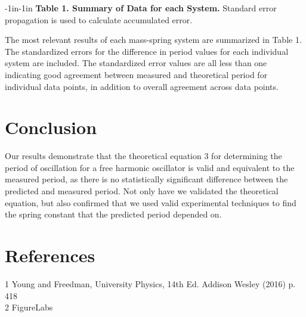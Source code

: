 \documentclass[11pt]{article}
\begin{document}
\begin{table}[H]
\begin{adjustwidth}{-1in}{-1in}
    \textbf{Table 1. Summary of Data for each System.} Standard error propagation is used to calculate accumulated error. 
    \begin{center}
    \end{center}
    
        
\end{adjustwidth}
\end{table}
The most relevant results of each mass-spring system are summarized in Table 1. The standardized errors for the difference in period values for each individual system are included. The standardized error values are all less than one indicating good agreement between measured and theoretical period for individual data points, in addition to overall agreement across data points. 

\section{Conclusion}
Our results demonstrate that the theoretical equation 3 for determining the period of oscillation for a free harmonic oscillator is valid and equivalent to the measured period, as there is no statistically significant difference between the predicted and measured period. Not only have we validated the theoretical equation, but also confirmed that we used valid experimental techniques to find the spring constant that the predicted period depended on.


\section{References}
1 Young and Freedman, University Physics, 14th Ed. Addison Wesley (2016) p. 418 \\
2 FigureLabs
\end{document}

